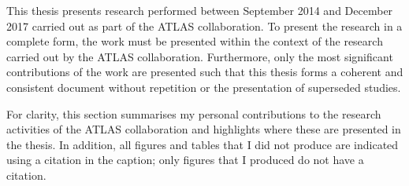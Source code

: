 This thesis presents research performed between September 2014 and December 2017 carried out as part of the ATLAS collaboration.
To present the research in a complete form, the work must be presented within the context of the research carried out by the ATLAS collaboration.
Furthermore, only the most significant contributions of the work are presented
such that this thesis forms a coherent and consistent document without repetition or the presentation of superseded studies.

For clarity, this section summarises my personal contributions to the research activities of the ATLAS collaboration
and highlights where these are presented in the thesis.
In addition, all figures and tables that I did not produce are indicated using a citation in the caption;
only figures that I produced do not have a citation.


